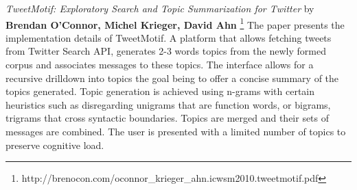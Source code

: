 \textit{TweetMotif: Exploratory Search and Topic Summarization for Twitter} by \textbf{Brendan O’Connor, Michel Krieger, David Ahn} \footnote{http://brenocon.com/oconnor_krieger_ahn.icwsm2010.tweetmotif.pdf}
\newline
The paper presents the implementation details of TweetMotif. A platform that allows fetching tweets from Twitter Search API, generates 2-3 words topics from the newly formed corpus and associates messages to these topics.
\newline
The interface allows for a recursive drilldown into topics the goal being to offer a concise summary of the topics generated. Topic generation is achieved using n-grams with certain heuristics such as disregarding unigrams that are function words, or bigrams, trigrams that cross syntactic boundaries. Topics are merged and their sets of messages are combined. The user is presented with a limited number of topics to preserve cognitive load.

